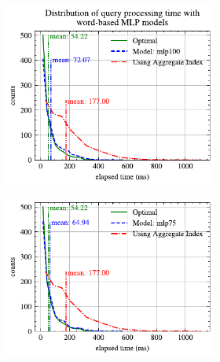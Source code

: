 \documentclass[conference]{IEEEtran}
\begin{document}
\begin{figure}[!th]
	\centering
	\begin{subfigure}{0.45\textwidth}
		\begin{subfigure}{\textwidth}
			\centering
%			
			\includegraphics[]{graphics/perf_dist_mlp100_B.pdf}
		\end{subfigure}
		\vfill
		\begin{subfigure}{\textwidth}
			\centering
			\includegraphics[]{graphics/perf_dist_mlp75_B.pdf}
		\end{subfigure}
		\vfill
		\begin{subfigure}{\textwidth}
			\centering

\end{subfigure}
\end{subfigure}
\end{figure}
\end{document}
